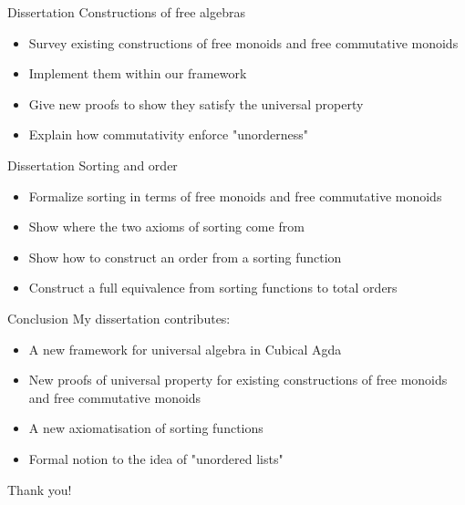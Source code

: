 \documentclass[9pt]{beamer}
\begin{document}
\begin{frame}{Dissertation}
  Constructions of free algebras

  \begin{itemize}
    \item Survey existing constructions of \alert{free monoids} and \alert{free commutative monoids}
    \item Implement them within our framework
    \item Give new proofs to show they satisfy the \alert{universal property}
    \item Explain how \alert{commutativity} enforce \alert{"unorderness"}
  \end{itemize}

\end{frame}

\begin{frame}{Dissertation}
  Sorting and order

  \begin{itemize}
    \item Formalize sorting in terms of \alert{free monoids} and \alert{free commutative monoids}
    \item Show where the \alert{two axioms} of sorting come from
    \item Show how to construct an order from a sorting function
    \item Construct a \alert{full equivalence} from sorting functions to total orders
  \end{itemize}

\end{frame}

\begin{frame}{Conclusion}
  My dissertation contributes:
  \begin{itemize}
    \item A \alert{new framework} for universal algebra in Cubical Agda
    \item \alert{New proofs} of universal property for existing constructions of free monoids and
          free commutative monoids
        \item A \alert{new axiomatisation} of sorting functions
        \item \alert{Formal notion} to the idea of "unordered lists"
  \end{itemize}
\end{frame}

\begin{frame}[standout]
    Thank you!
\end{frame}
\end{document}

